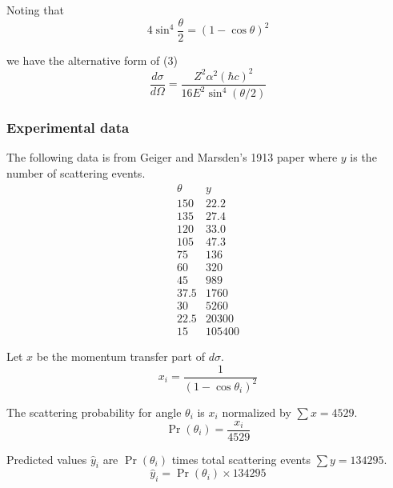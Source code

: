 Noting that
\begin{equation*}
4\sin^4\frac{\theta}{2}=(1-\cos\theta)^2
\end{equation*}

we have the alternative form of (3)
\begin{equation*}
\frac{d\sigma}{d\Omega}=\frac{Z^2\alpha^2(\hbar c)^2}{16E^2\sin^4(\theta/2)}
\end{equation*}

\subsubsection*{Experimental data}
The following data is from Geiger and Marsden's 1913 paper where
$y$ is the number of scattering events.
\begin{equation*}
\begin{matrix}
\theta & y\\
150 & 22.2\\
135 & 27.4\\
120 & 33.0\\
105 & 47.3\\
75 & 136\\
60 & 320\\
45 & 989\\
37.5 & 1760\\
30 & 5260\\
22.5 & 20300\\
15 & 105400
\end{matrix}
\end{equation*}

Let $x$ be the momentum transfer part of $d\sigma$.
\begin{equation*}
x_i=\frac{1}{(1-\cos\theta_i)^2}
\end{equation*}

The scattering probability for angle $\theta_i$ is $x_i$ normalized by $\sum x=4529$.
\begin{equation*}
\Pr(\theta_i)=\frac{x_i}{4529}
\end{equation*}

Predicted values $\hat y_i$ are $\Pr(\theta_i)$
times total scattering events $\sum y=134295$.
\begin{equation*}
\hat y_i=\Pr(\theta_i)\times134295
\end{equation*}

